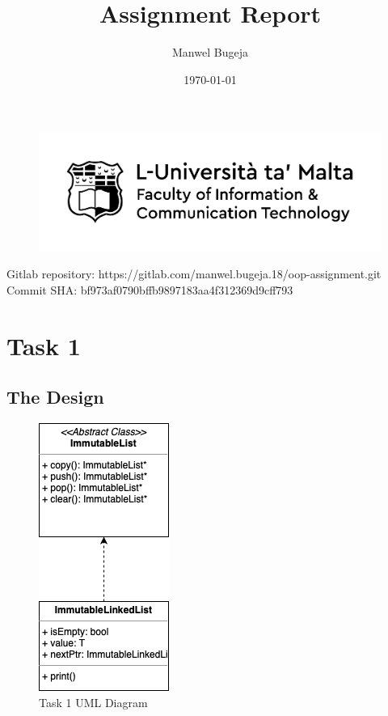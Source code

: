 \documentclass[a4paper, 12pt]{report}
\begin{document}
\begin{figure}[H]
    \centering
    \includegraphics[width=1\textwidth]{Logo}
\end{figure}

\title{Assignment Report}
\author{Manwel Bugeja}
\date{\today}
\maketitle

\tableofcontents
\newpage

Gitlab repository: https://gitlab.com/manwel.bugeja.18/oop-assignment.git
Commit SHA: bf973af0790bffb9897183aa4f312369d9cff793

\section{Task 1}

\subsection{The Design}

\begin{figure}[H]
    \centering
    \includegraphics{"UML 1"}
    \caption{Task 1 UML Diagram}
\end{figure}
\end{document}
